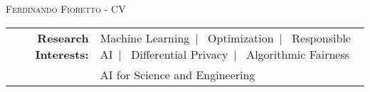 \documentclass[localFont,alternative]{documentMETADATA}
\begin{document}
\makecvheader\sloppy\allowdisplaybreaks

	\makecvfooter
		{\textsc{}} %
		{\textsc{Ferdinando Fioretto - CV}}
		{\thepage}


	\begin{tabular}{r l} 
	{\bf Research Interests:} &
	{Machine Learning}~|~
	{Optimization}~|~
	{Responsible AI}~|~
	{Differential Privacy}~|~
	{Algorithmic Fairness}\\
	&{AI for Science and Engineering}
	\end{tabular}



		 
	
	
	
	 
	          
	
	
\end{document}
